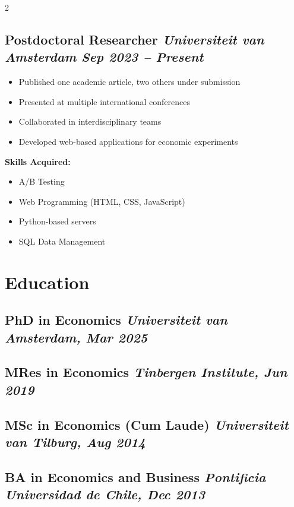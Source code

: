 \documentclass[11pt,a4paper]{article}
\begin{document}
\begin{paracol}{2}
\begin{rightcolumn}
\subsection*{Postdoctoral Researcher \hfill \small\textit{Universiteit van Amsterdam \hfill Sep 2023 – Present}}
\begin{itemize}
  \item Published one academic article, two others under submission
  \item Presented at multiple international conferences
  \item Collaborated in interdisciplinary teams
  \item Developed web-based applications for economic experiments
\end{itemize}
\textbf{Skills Acquired:}
\begin{itemize}
  \item A/B Testing
  \item Web Programming (HTML, CSS, JavaScript)
  \item Python-based servers
  \item SQL Data Management
\end{itemize}

\section*{Education}

\subsection*{PhD in Economics \hfill \small\textit{Universiteit van Amsterdam, Mar 2025}}

\subsection*{MRes in Economics \hfill \small\textit{Tinbergen Institute, Jun 2019}}

\subsection*{MSc in Economics (Cum Laude) \hfill \small\textit{Universiteit van Tilburg, Aug 2014}}

\subsection*{BA in Economics and Business \hfill \small\textit{Pontificia Universidad de Chile, Dec 2013}}

\end{rightcolumn}
\end{paracol}
\end{document}
